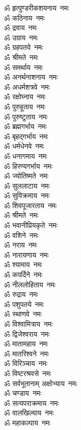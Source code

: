 \begin{multicols}{2}
\begin{flushleft}
ॐ हृत्पुण्डरीकशयनाय~नमः\hfill{}\\
ॐ कठिनाय~नमः\\
ॐ द्रवाय~नमः\\
ॐ उग्राय~नमः\\
ॐ ग्रहपतये~नमः\\
ॐ श्रीमते~नमः\\
ॐ समर्थाय~नमः\\
ॐ अनर्थनाशनाय~नमः\\
ॐ अधर्मशत्रवे~नमः\\
ॐ रक्षोघ्नाय~नमः\\
ॐ पुरुहूताय~नमः\hfill{}\\
ॐ पुरुष्टुताय~नमः\\
ॐ ब्रह्मगर्भाय~नमः\\
ॐ बृहद्गर्भाय~नमः\\
ॐ धर्मधेनवे~नमः\\
ॐ धनागमाय~नमः\\
ॐ हिरण्यगर्भाय~नमः\\
ॐ ज्योतिष्मते~नमः\\
ॐ सुललाटाय~नमः\\
ॐ सुविक्रमाय~नमः\\
ॐ शिवपूजारताय~नमः\hfill{}\\
ॐ श्रीमते~नमः\\
ॐ भवानीप्रियकृते~नमः\\
ॐ वशिने~नमः\\
ॐ नराय~नमः\\
ॐ नारायणाय~नमः\\
ॐ श्यामाय~नमः\\
ॐ कपर्दिने~नमः\\
ॐ नीललोहिताय~नमः\\
ॐ रुद्राय~नमः\\
ॐ पशुपतये~नमः\hfill{}\\
ॐ स्थाणवे~नमः\\
ॐ विश्वामित्राय~नमः\\
ॐ द्विजेश्वराय~नमः\\
ॐ मातामहाय~नमः\\
ॐ मातरिश्वने~नमः\\
ॐ विरिञ्चाय~नमः\\
ॐ विष्टरश्रवसे~नमः\\
ॐ सर्वभूतानाम् अक्षोभ्याय~नमः\\
ॐ चण्डाय~नमः\\
ॐ सत्यपराक्रमाय~नमः\hfill{}\\
ॐ वालखिल्याय~नमः\\
ॐ महाकल्पाय~नमः\\

\end{flushleft}
\end{multicols}
